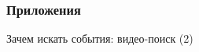 
\subsubsection{Приложения}


\begin{frame}{Зачем искать события: видео-поиск (2)}
    
    \vspace{1.5em}
    
    
    
\end{frame}



